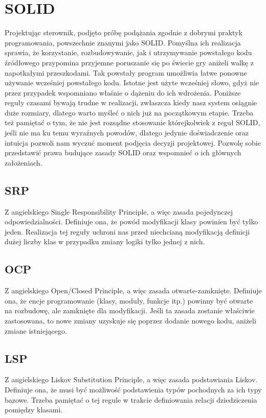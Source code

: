 \chapter{SOLID}
Projektując sterownik, podjęto próbę podążania zgodnie z dobrymi praktyk programowania, powszechnie znanymi jako SOLID.
Pomyślna ich realizacja sprawia, że korzystanie, rozbudowywanie, jak i utrzymywanie powstałego kodu źródłowego przypomina
przyjemne poruszanie się po świecie gry aniżeli walkę z napotkałymi przeszkodami. 
Tak powstały program umożliwia łatwe ponowne używanie wcześniej powstałego kodu. 
Istotne jest użyte wcześniej słowo, gdyż nie przez przypadek wspomniano właśnie o dążeniu do ich wdrożenia.
Poniższe reguły czasami bywają trudne w realizacji, zwłaszcza kiedy nasz system osiągnie duże rozmiary, dlatego warto myśleć o nich już na początkowym etapie. 
Trzeba też pamiętać o tym, że nie jest rozsądne stosowanie którejkolwiek z reguł SOLID, jeśli nie ma ku temu wyraźnych powodów, dlatego 
jedynie doświadczenie oraz intuicja pozwoli nam wyczuć moment podjęcia decyzji projektowej.
Pozwolę sobie przedstawić prawa budujące zasady SOLID oraz wspomnieć o ich głównych założeniach.

\section{SRP}
Z angielskiego Single Responsibility Principle, a więc zasada pojedynczej odpowiedzialności.
Definiuje ona, że powód modyfikacji klasy powinien być tylko jeden. \autocite[103]{martin2015zwinne}
Realizacja tej reguły uchroni nas przed niechcianą modyfikacją definicji dużej liczby klas w przypadku zmiany logiki tylko jednej z nich.

\section{OCP}
Z angielskiego Open/Closed Principle, a więc zasada otwarte-zamknięte.
Definiuje ona, że encje programowanie (klasy, moduły, funkcje itp.) powinny być otwarte na rozbudowę, ale zamknięte dla modyfikacji.\autocite[117]{martin2015zwinne}
Jeśli ta zasada zostanie właściwie zastosowana, to nowe zmiany uzyskuje się poprzez dodanie nowego kodu, aniżeli zmiane istniejącego. 

\section{LSP}
Z angielskiego Liskov Substitution Principle, a więc zasada podstawiania Liskov.
Definiuje ona, że musi być możliwość podstawienia typów pochodnych za ich typy bazowe.\autocite[127]{martin2015zwinne}
Trzeba pamiętać o tej regule w trakcie definiowania relacji dziedziczenia pomiędzy klasami.

